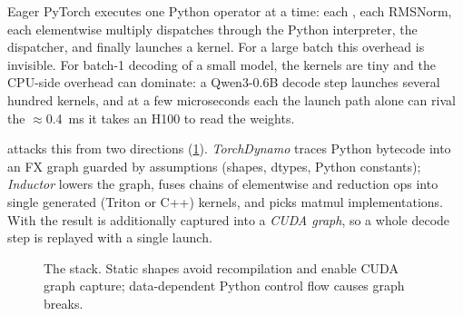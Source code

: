 Eager PyTorch executes one Python operator at a time: each , each RMSNorm, each
elementwise multiply dispatches through the Python interpreter, the dispatcher, and finally launches
a kernel. For a large batch this overhead is invisible. For batch-1 decoding of a small model, the
kernels are tiny and the CPU-side overhead can dominate: a Qwen3-0.6B decode step launches several
hundred kernels, and at a few microseconds each the launch path alone can rival the
$\approx$\SI{0.4}{ms} it takes an H100 to read the weights.

 attacks this from two directions (\cref{fig:inference:compile}).
\emph{TorchDynamo} traces Python bytecode into an FX graph guarded by assumptions (shapes,
dtypes, Python constants); \emph{Inductor} lowers the graph, fuses chains of elementwise and
reduction ops into single generated (Triton or C++) kernels, and picks matmul implementations.
With  the result is additionally captured into a \emph{CUDA graph}, so a
whole decode step is replayed with a single launch.

\begin{figure}[ht]
\centering
{}
\caption{The  stack. Static shapes avoid recompilation and enable CUDA graph
capture; data-dependent Python control flow causes graph breaks.}
\label{fig:inference:compile}
\end{figure}

